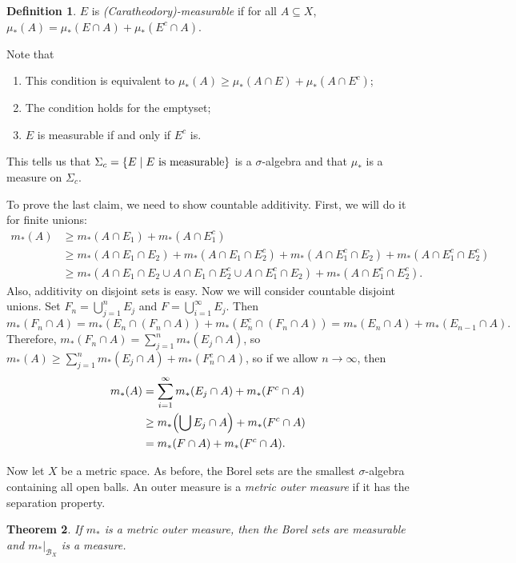 \documentclass[leqno, openany]{memoir}
\newtheorem{thm}{Theorem}[chapter]
\theoremstyle{definition}
\newtheorem{defn}[thm]{Definition}
\theoremstyle{remark}
\theoremstyle{plain}
\theoremstyle{definition}
\theoremstyle{remark}
\newcommand{\mc}[1]{\mathcal{#1}}
\begin{document}
\begin{defn} $E$ is \textit{(Caratheodory)-measurable} if for all $A \subseteq
X$, $\mu_*(A) = \mu_*(E \cap A) + \mu_*(E^c \cap A)$.  \end{defn}

Note that \begin{enumerate} \item This condition is equivalent to $\mu_*(A)
\geq \mu_*(A \cap E) + \mu_*(A \cap E^c)$; \item The condition holds for the
emptyset; \item $E$ is measurable if and only if $E^c$ is.  \end{enumerate}
This tells us that $\Sigma_c = \qty{E \mid E \text{ is measurable}}$ is a
$\sigma$-algebra and that $\mu_*$ is a measure on $\Sigma_c$.

To prove the last claim, we need to show countable additivity. First, we will
do it for finite unions: \begin{align*} m_*(A) &\geq m_*(A \cap E_1) + m_*(A
    \cap E_1^c) \\ &\geq m_*(A \cap E_1 \cap E_2) + m_*(A \cap E_1 \cap E_2^c)
    + m_*(A \cap E_1^c \cap E_2) + m_*(A \cap E_1^c \cap E_2^c) \\ &\geq m_*(A
\cap E_1 \cap E_2 \cup A \cap E_1 \cap E_2^c \cup A \cap E_1^c \cap E_2) +
m_*(A \cap E_1^c \cap E_2^c).  \end{align*} Also, additivity on disjoint sets
is easy. Now we will consider countable disjoint unions.  Set $F_n =
\bigcup_{j=1}^n E_j$ and $F = \bigcup_{i=1}^{\infty} E_j$. Then \[ m_*(F_n \cap
A) = m_*(E_n \cap (F_n \cap A)) + m_*(E_n^c \cap (F_n \cap A)) = m_*(E_n \cap
A) + m_*(E_{n-1} \cap A). \] Therefore, $m_*(F_n \cap A) = \sum_{j=1}^n m_*(E_j
\cap A)$, so $m_*(A) \geq \sum_{j=1}^n m_*(E_j \cap A) + m_*(F_n^c \cap A)$, so
if we allow $n \to \infty$, then \begin{align*} m_*(A) &= \sum_{i=1}^{\infty}
    m_*(E_j \cap A) + m_*(F^c \cap A) \\ &\geq m_*\qty(\bigcup E_j \cap A) +
m_*(F^c \cap A) \\ &= m_*(F \cap A) + m_*(F^c \cap A).  \end{align*}

Now let $X$ be a metric space. As before, the Borel sets are the smallest
$\sigma$-algebra containing all open balls. An outer measure is a
\textit{metric outer measure} if it has the separation property.

\begin{thm} If $m_*$ is a metric outer measure, then the Borel sets are
measurable and $m_*|_{\mc{B}_X}$ is a measure.  \end{thm}
\end{document}
